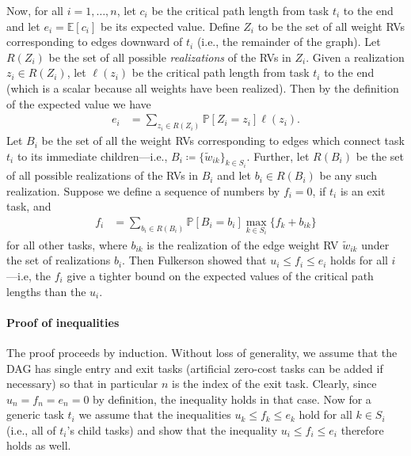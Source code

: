 \documentclass[12pt]{article}
\def\P{\mathbb{P}}
\def\E{\mathbb{E}}
\begin{document}
Now, for all $i = 1, \dots, n$, let $c_i$ be the critical path length from task $t_i$ to the end and let $e_i = \E[c_i]$ be its expected value. Define $Z_i$ to be the set of all weight RVs corresponding to edges downward of $t_i$ (i.e., the remainder of the graph). Let $R(Z_i)$ be the set of all possible {\em realizations} of the RVs in $Z_i$. Given a realization $z_i \in R(Z_i)$, let $\ell(z_i)$ be the critical path length from task $t_i$ to the end (which is a scalar because all weights have been realized). Then by the definition of the expected value we have
\begin{align}
e_i &= \sum_{z_i \in R(Z_i)} \P[Z_i = z_i] \ell(z_i). \label{eq.ei}
\end{align}
Let $B_i$ be the set of all the weight RVs corresponding to edges which connect task $t_i$ to its immediate children---i.e., $B_i \coloneqq \{ \tilde{w}_{ik} \}_{k \in S_i}$. Further, let $R(B_i)$ be the set of all possible realizations of the RVs in $B_i$ and let $b_i \in R(B_i)$ be any such realization. Suppose we define a sequence of numbers by $f_i = 0$, if $t_i$ is an exit task, and
\begin{align}
f_i &= \sum_{b_i \in R(B_i)} \P[B_i = b_i] \max_{k \in S_i} \{ f_k + b_{ik} \} \label{eq.f_fulkerson}
\end{align}
for all other tasks, where $b_{ik}$ is the realization of the edge weight RV $\tilde{w}_{ik}$ under the set of realizations $b_i$. Then Fulkerson showed that $u_i \leq f_i \leq e_i$ holds for all $i$---i.e, the $f_i$ give a tighter bound on the expected values of the critical path lengths than the $u_i$.

\paragraph{Proof of inequalities}
\label{para.fulkerson_proof}

The proof proceeds by induction. Without loss of generality, we assume that the DAG has single entry and exit tasks (artificial zero-cost tasks can be added if necessary) so that in particular $n$ is the index of the exit task. Clearly, since $u_n = f_n = e_n = 0$ by definition, the inequality holds in that case. Now for a generic task $t_i$ we assume that the inequalities $u_k \leq f_k \leq e_k$ hold for all $k \in S_i$ (i.e., all of $t_i$'s child tasks) and show that the inequality $u_i \leq f_i \leq e_i$ therefore holds as well. 
\end{document}
